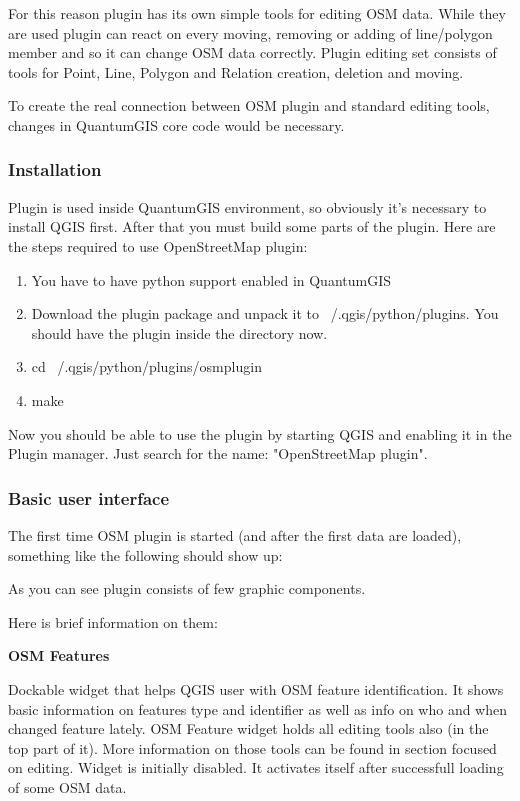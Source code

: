For this reason plugin has its own simple tools for editing OSM data. While
they are used plugin can react on every moving, removing or adding of
line/polygon member and so it can change OSM data correctly. Plugin editing
set consists of tools for Point, Line, Polygon and Relation creation,
deletion and moving.

To create the real connection between OSM plugin and standard editing tools,
changes in QuantumGIS core code would be necessary.

\subsubsection{Installation}

Plugin is used inside QuantumGIS environment, so obviously it's necessary to
install QGIS first. After that you must build some parts of the plugin. Here
are the steps required to use OpenStreetMap plugin:

\begin{enumerate}
\item You have to have python support enabled in QuantumGIS
\item Download the plugin package and unpack it to ~/.qgis/python/plugins.
You should have the plugin inside the directory now. 
\item cd ~/.qgis/python/plugins/osmplugin 
\item make 
\end{enumerate}

Now you should be able to use the plugin by starting QGIS and enabling it in
the Plugin manager. Just search for the name: "OpenStreetMap plugin". 

\subsubsection{Basic user interface}

The first time OSM plugin is started (and after the first data are loaded),
something like the following should show up:

As you can see plugin consists of few graphic components.

Here is brief information on them:

\textbf{OSM Features}

Dockable widget that helps QGIS user with OSM feature identification. It
shows basic information on features type and identifier as well as info on
who and when changed feature lately. OSM Feature widget holds all editing
tools also (in the top part of it). More information on those tools can be
found in section focused on editing. Widget is initially disabled. It
activates itself after successfull loading of some OSM data.

